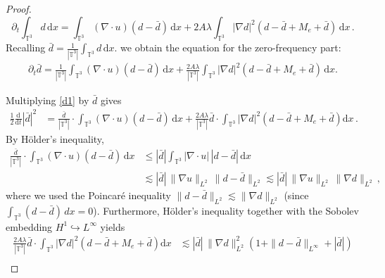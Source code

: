 \documentclass[reqno,11pt]{amsart}
\numberwithin{equation}{section}
\def\d{\mathrm{d}}
\begin{document}
\begin{proof}
$$\partial_t \int_{\mathbb{T}^3} d\, \d x = \int_{\mathbb{T}^3} (\nabla \cdot u)(d-\bar{d})\, \d x + 2A \lambda \int_{\mathbb{T}^3} |\nabla d|^2 (d-\bar{d} + M_e + \bar{d} ) \, \d x \,.$$
Recalling $ \bar{d} = \frac{1}{|\mathbb{T}^3|} \int_{\mathbb{T}^3} d\, \d x $. we obtain the equation for the zero-frequency part:
\begin{equation}\label{d1}
\begin{aligned}
\partial_t \bar{d} = \frac{1}{|\mathbb{T}^3|} \int_{\mathbb{T}^3} (\nabla\cdot u)(d-\bar{d})\, \d x +\frac {2A\lambda}{|\mathbb{T}^3|} \int_{\mathbb{T}^3} |\nabla d|^2 (d-\bar{d} +M_e+\bar{d})\, \d x.
\end{aligned}
\end{equation}

Multiplying \eqref{d1} by $\bar{d}$ gives                       \begin{equation}\label{d3}
\begin{aligned}      
\frac{1}{2} \frac{\d}{\d t} |\bar{d}|^2 & = \frac{\bar{d}}{|\mathbb{T}^3|} \cdot \int_{\mathbb{T}^3} (\nabla \cdot u)(d - \bar{d}) \, \d x + \frac{2 A \lambda}{|\mathbb{T}^3|} \bar{d} \cdot \int_{\mathbb{T}^3} |\nabla d|^2 \left( d - \bar{d} + M_e + \bar{d} \right) \d x \,.
\end{aligned}
\end{equation}                              
By H\"older's inequality,
  \begin{equation}\label{d4}
\begin{aligned}      
\frac{\bar{d}}{|\mathbb{T}^3|} \cdot \int_{\mathbb{T}^3} (\nabla \cdot u)(d - \bar{d}) \, \d x &\leq |\bar{d}| \int_{\mathbb{T}^3} |\nabla \cdot u| \, |d - \bar{d}| \, \d x \\
&\lesssim |\bar{d}| \, \|\nabla u\|_{L^2} \, \|d - \bar{d}\|_{L^2} \lesssim |\bar{d}| \, \|\nabla u\|_{L^2} \, \|\nabla d\|_{L^2} \,,
\end{aligned}
\end{equation}
where we used the Poincar\'e inequality $\|d-\bar{d}\|_{L^2} \lesssim\|\nabla d\|_{L^2}$ (since $\int_{\mathbb{T}^3} (d-\bar{d})\, dx = 0$). Furthermore, Hölder's inequality together with the Sobolev embedding $H^1 \hookrightarrow L^\infty$ yields
  \begin{equation}\label{d5}
\begin{aligned}   
\frac{2A\lambda}{|\mathbb{T}^3|} \bar{d} \cdot \int_{\mathbb{T}^3} |\nabla d|^2 \left( d - \bar{d} + M_e + \bar{d} \right) \d x & \lesssim  |\bar{d}| \, \|\nabla d\|_{L^2}^2 \left( 1 + \|d - \bar{d}\|_{L^\infty} + |\bar{d}| \right) \\

\end{aligned}
\end{equation}
\end{proof}
\end{document}
